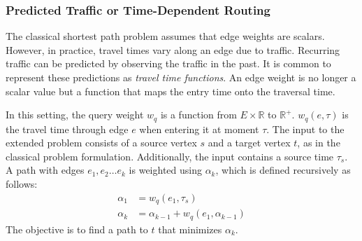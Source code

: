 \documentclass[manuscript,review]{acmart}
\begin{document}

\subsubsection{Predicted Traffic or Time-Dependent Routing}
\label{sec:predicted-traffic}

The classical shortest path problem assumes that edge weights are scalars.
However, in practice, travel times vary along an edge due to traffic.
Recurring traffic can be predicted by observing the traffic in the past.
It is common \cite{bgsv-mtdtt-13,bdpw-dtdrp-16,swz-sfert-21} to represent these predictions as \emph{travel time functions}.
An edge weight is no longer a scalar value but a function that maps the entry time onto the traversal time.

In this setting, the query weight $w_q$ is a function from $E\times \mathbb{R}$ to $\mathbb{R}^+$.
$w_q(e, \tau)$ is the travel time through edge $e$ when entering it at moment $\tau$.
The input to the extended problem consists of a source vertex $s$ and a target vertex $t$, as in the classical problem formulation.
Additionally, the input contains a source time $\tau_s$.
A path with edges $e_1,e_2\ldots e_k$ is weighted using $\alpha_k$, which is defined recursively as follows:\[
\begin{split}
\alpha_{1} & = w_q(e_1, \tau_s) \\
\alpha_{k} & = \alpha_{k-1} + w_q(e_1, \alpha_{k-1})
\end{split}
\]
The objective is to find a path to $t$ that minimizes $\alpha_k$.
\end{document}
